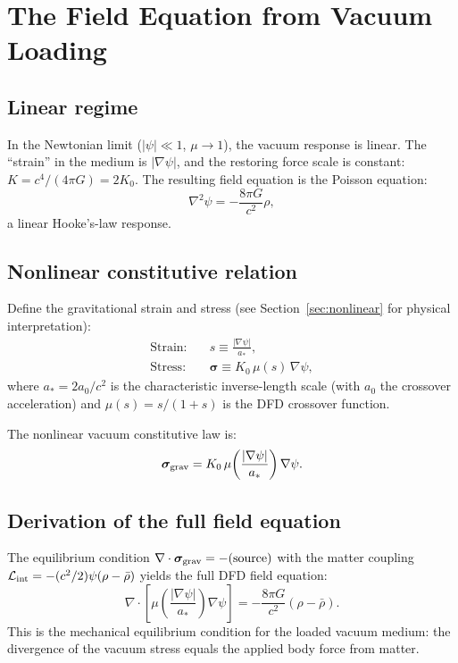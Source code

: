 \documentclass[aps,prd,twocolumn,superscriptaddress,nofootinbib]{revtex4-2}
\begin{document}
\section{The Field Equation from Vacuum Loading}
\label{sec:field-eqn}

\subsection{Linear regime}

In the Newtonian limit ($|\psi| \ll 1$, $\mu \to 1$), the vacuum
response is linear.  The ``strain'' in the medium is $|\nabla\psi|$,
and the restoring force scale is constant: $K = c^4/(4\pi G) = 2K_0$.  The
resulting field equation is the Poisson equation:
\begin{equation}
\nabla^2\psi = -\frac{8\pi G}{c^2}\rho,
\end{equation}
a linear Hooke's-law response.

\subsection{Nonlinear constitutive relation}

Define the gravitational strain and stress (see
Section~\ref{sec:nonlinear} for physical interpretation):
\begin{align}
\text{Strain:} \quad & s \equiv \frac{|\nabla\psi|}{a_*},
\label{eq:strain-def} \\
\text{Stress:} \quad & \bm{\sigma} \equiv
K_0\,\mu(s)\,\nabla\psi,
\label{eq:stress-def}
\end{align}
where $a_* = 2a_0/c^2$ is the characteristic inverse-length scale
(with $a_0$ the crossover acceleration) and
$\mu(s) = s/(1+s)$ is the DFD crossover function.

The nonlinear vacuum constitutive law is:
\begin{equation}
\bm{\sigma}_{\rm grav}
= K_0\,\mu\!\left(\frac{|\nabla\psi|}{a_*}\right)
\nabla\psi.
\label{eq:constitutive-nonlinear}
\end{equation}

\subsection{Derivation of the full field equation}

The equilibrium condition
$\nabla \cdot \bm{\sigma}_{\rm grav} = -(\text{source})$
with the matter coupling
$\mathcal{L}_{\rm int} = -(c^2/2)\psi(\rho - \bar\rho)$
yields the full DFD field equation:
\begin{equation}
\nabla\cdot\!\left[\mu\!\left(\frac{|\nabla\psi|}{a_*}\right)
\nabla\psi\right]
= -\frac{8\pi G}{c^2}(\rho - \bar\rho).
\label{eq:full-field}
\end{equation}
This is the mechanical equilibrium condition for the loaded vacuum
medium: the divergence of the vacuum stress equals the applied body
force from matter.
\end{document}
